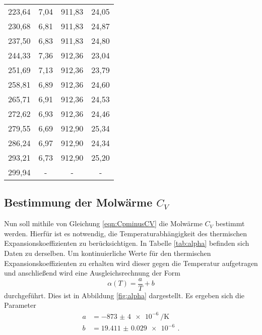 \begin{table}[htp]
\begin{center}
\begin{tabular}{cccc}
			223,64 & 7,04 & 911,83 & 24,05\\
			230,68 & 6,81 & 911,83 & 24,87\\
			237,50 & 6,83 & 911,83 & 24,80\\
			244,33 & 7,36 & 912,36 & 23,04\\
			251,69 & 7,13 & 912,36 & 23,79\\
			258,81 & 6,89 & 912,36 & 24,60\\
			265,71 & 6,91 & 912,36 & 24,53\\
			272,62 & 6,93 & 912,36 & 24,46\\
			279,55 & 6,69 & 912,90 & 25,34\\
			286,24 & 6,97 & 912,90 & 24,34\\
			293,21 & 6,73 & 912,90 & 25,20\\
			299,94 & - & - & -\\
		\bottomrule
		\end{tabular}
	\end{center}
\end{table}


\subsection{Bestimmung der Molwärme $C_V$}
\label{subsec:cv}

Nun soll mithile von Gleichung \eqref{eqn:CpminusCV} die Molwärme $C_V$ bestimmt werden.
Hierfür ist es notwendig, die Temperaturabhängigkeit des thermischen Expansionskoeffizienten
\alpha zu berücksichtigen. In Tabelle \ref{tab:alpha} befinden sich Daten zu derselben.
Um kontinuierliche Werte für den thermischen Expansionskoeffizienten zu erhalten wird
dieser gegen die Temperatur aufgetragen und anschließend wird eine Ausgleichsrechnung der Form
\begin{equation*}
  \alpha(T)=\frac{a}{T}+b
\end{equation*}
durchgeführt. Dies ist in Abbildung \ref{fig:alpha} dargestellt. Es ergeben sich die Parameter
\begin{align*}
  a&=\SI{-873(4)e-6}{\per\kelvin} \,\\
  b&=\SI{19.411(29)e-6}{} \,.
\end{align*}


